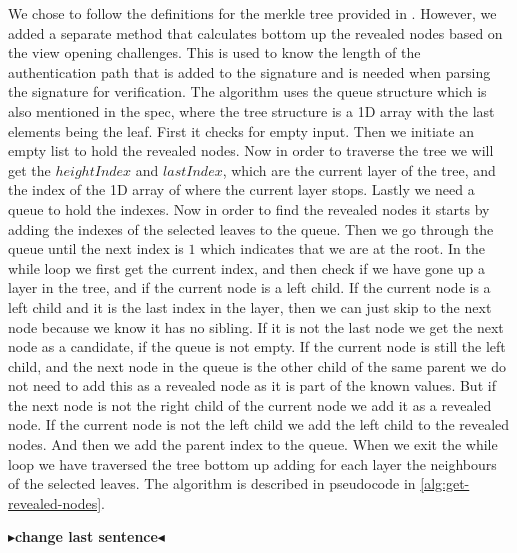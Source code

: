 \documentclass[twoside,11pt]{report}
\theoremstyle{definition}
\theoremstyle{plain}
\newcommand{\todo}[1]{{\color[rgb]{.5,0,0}\textbf{$\blacktriangleright$#1$\blacktriangleleft$}}}
\begin{document}
We chose to follow the definitions for the merkle tree provided in \cite{aguilarsyndrome11}. However, we added a separate method that calculates bottom up the revealed nodes based on the view opening challenges. This is used to know the length of the authentication path that is added to the signature and is needed when parsing the signature for verification. The algorithm uses the queue structure which is also mentioned in the spec, where the tree structure is a 1D array with the last elements being the leaf. First it checks for empty input. Then we initiate an empty list to hold the revealed nodes. Now in order to traverse the tree we will get the $heightIndex$ and $lastIndex$, which are the current layer of the tree, and the index of the 1D array of where the current layer stops. Lastly we need a queue to hold the indexes. Now in order to find the revealed nodes it starts by adding the indexes of the selected leaves to the queue. Then we go through the queue until the next index is $1$ which indicates that we are at the root. In the while loop we first get the current index, and then check if we have gone up a layer in the tree, and if the current node is a left child. If the current node is a left child and it is the last index in the layer, then we can just skip to the next node because we know it has no sibling. If it is not the last node we get the next node as a candidate, if the queue is not empty. If the current node is still the left child, and the next node in the queue is the other child of the same parent we do not need to add this as a revealed node as it is part of the known values. But if the next node is not the right child of the current node we add it as a revealed node. If the current node is not the left child we add the left child to the revealed nodes. And then we add the parent index to the queue. When we exit the while loop we have traversed the tree bottom up adding for each layer the neighbours of the selected leaves. The algorithm is described in pseudocode in \autoref{alg:get-revealed-nodes}.

\todo{change last sentence}
\end{document}
